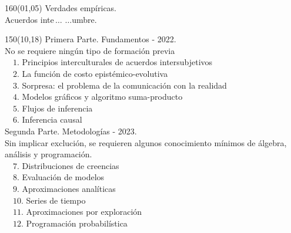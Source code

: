 \documentclass[shownotes,aspectratio=169]{beamer}
\begin{document}
\begin{frame}

\begin{textblock}{160}(01,05)\centering
\textcolor{black!85}{{\Large
 Verdades empíricas. \\ \normalsize Acuerdos inte\,$\dots$ \hspace{1.3cm} $\dots$umbre.}}
\end{textblock}


\begin{textblock}{150}(10,18)
\normalsize Primera Parte. Fundamentos - 2022. \\
\scriptsize No se requiere ningún tipo de formación previa \\[0.15cm] \footnotesize
\ \ $1$. Principios interculturales de acuerdos intersubjetivos \\
\ \ $2$. La función de costo epistémico-evolutiva\\
\ \ $3$. Sorpresa: el problema de la comunicación con la realidad \\
\ \ $4$. Modelos gráficos y algoritmo suma-producto\\
\ \ $5$. Flujos de inferencia \\
\ \ $6$. Inferencia causal \\[0.4cm]
\normalsize Segunda Parte. Metodologías - 2023.\scriptsize \\ Sin implicar exclución, se requieren algunos conocimiento mínimos de álgebra, análisis y programación. \\[0.15cm] \footnotesize
\ \ $7$. Distribuciones de creencias \\
\ \ $8$. Evaluación de modelos \\
\ \ $9$. Aproximaciones analíticas \\
\ \ $10$. Series de tiempo\\
\ \ $11$. Aproximaciones por exploración \\
\ \ $12$. Programación probabilística\\
\end{textblock}



\end{frame}
\end{document}
